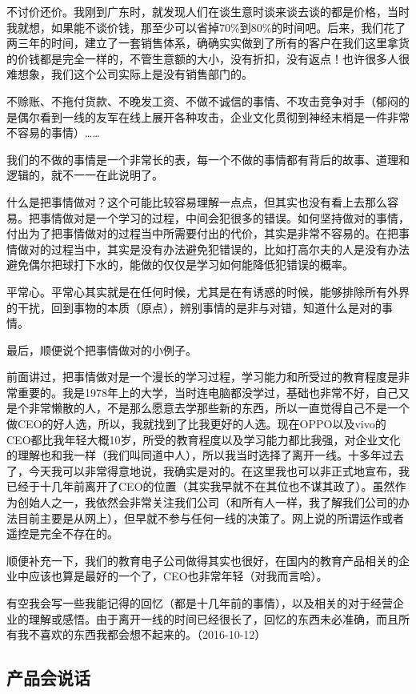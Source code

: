 不讨价还价。我刚到广东时，就发现人们在谈生意时谈来谈去谈的都是价格，当时我就想，如果能不谈价钱，那至少可以省掉70\%到80\%的时间吧。后来，我们花了两三年的时间，建立了一套销售体系，确确实实做到了所有的客户在我们这里拿货的价钱都是完全一样的，不管生意额的大小，没有折扣，没有返点！也许很多人很难想象，我们这个公司实际上是没有销售部门的。

不赊账、不拖付货款、不晚发工资、不做不诚信的事情、不攻击竞争对手（郁闷的是偶尔看到一线的友军在线上展开各种攻击，企业文化贯彻到神经末梢是一件非常不容易的事情）……

我们的不做的事情是一个非常长的表，每一个不做的事情都有背后的故事、道理和逻辑的，就不一一在此说明了。

什么是把事情做对？这个可能比较容易理解一点点，但其实也没有看上去那么容易。把事情做对是一个学习的过程，中间会犯很多的错误。如何坚持做对的事情，付出为了把事情做对的过程当中所需要付出的代价，其实是非常不容易的。在把事情做对的过程当中，其实是没有办法避免犯错误的，比如打高尔夫的人是没有办法避免偶尔把球打下水的，能做的仅仅是学习如何能降低犯错误的概率。

平常心。平常心其实就是在任何时候，尤其是在有诱惑的时候，能够排除所有外界的干扰，回到事物的本质（原点），辨别事情的是非与对错，知道什么是对的事情。

最后，顺便说个把事情做对的小例子。

前面讲过，把事情做对是一个漫长的学习过程，学习能力和所受过的教育程度是非常重要的。我是1978年上的大学，当时连电脑都没学过，基础也非常不好，自己又是个非常懒散的人，不是那么愿意去学那些新的东西，所以一直觉得自己不是一个做CEO的好人选，所以，我就找到了比我更好的人选。现在OPPO以及vivo的CEO都比我年轻大概10岁，所受的教育程度以及学习能力都比我强，对企业文化的理解也和我一样（我们叫同道中人），所以我当时选择了离开一线。十多年过去了，今天我可以非常得意地说，我确实是对的。在这里我也可以非正式地宣布，我已经于十几年前离开了CEO的位置（其实我早就不在其位也不谋其政了）。虽然作为创始人之一，我依然会非常关注我们公司（和所有人一样，我了解我们公司的办法目前主要是从网上），但早就不参与任何一线的决策了。网上说的所谓运作或者遥控是完全不存在的。

顺便补充一下，我们的教育电子公司做得其实也很好，在国内的教育产品相关的企业中应该也算是最好的一个了，CEO也非常年轻（对我而言哈）。

有空我会写一些我能记得的回忆（都是十几年前的事情），以及相关的对于经营企业的理解或感悟。由于离开一线的时间已经很长了，回忆的东西未必准确，而且所有我不喜欢的东西我都会想不起来的。（2016-10-12）

\subsection{产品会说话}

